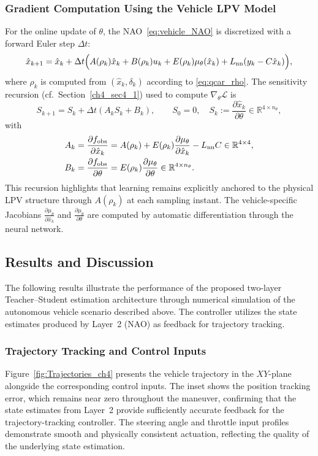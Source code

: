 \subsubsection{Gradient Computation Using the Vehicle LPV Model}\label{sec6_gradient}
For the online update of $\theta$, the NAO~\eqref{eq:vehicle_NAO} is discretized with a forward Euler step $\Delta t$:
\begin{equation}\label{eq:vehicle_NAO_discrete}
\hat{x}_{k+1} = \hat{x}_k + \Delta t\Big(A(\rho_k)\hat{x}_k + B(\rho_k)u_k + E(\rho_k)\mu_\theta(\hat{x}_k) + L_{\text{nn}}(y_k - C\hat{x}_k)\Big),
\end{equation}
where $\rho_k$ is computed from $(\hat{x}_k,\delta_k)$ according to \eqref{eq:qcar_rho}.
The sensitivity recursion (cf.~Section~\ref{ch4_sec4_1}) used to compute $\nabla_\theta\mathcal{L}$ is
\begin{equation}\label{eq:vehicle_sensitivity}
S_{k+1}=S_k+\Delta t\left(A_kS_k+B_k\right), \qquad S_0 = 0, \quad S_k:=\frac{\partial \hat{x}_k}{\partial \theta} \in \mathbb{R}^{4\times n_\theta},
\end{equation}
with
\begin{align}
    A_k &= \frac{\partial f_{\mathrm{obs}}}{\partial \hat{x}_k} = A(\rho_k) + E(\rho_k)\frac{\partial\mu_\theta}{\partial\hat{x}_k} - L_{\text{nn}} C \in \mathbb{R}^{4\times 4}, \label{eq:vehicle_Ak}\\
    B_k &= \frac{\partial f_{\mathrm{obs}}}{\partial \theta} = E(\rho_k)\frac{\partial\mu_\theta}{\partial\theta} \in \mathbb{R}^{4\times n_\theta}. \label{eq:vehicle_Bk}
\end{align}
This recursion highlights that learning remains explicitly anchored to the physical LPV structure through $A(\rho_k)$ at each sampling instant. The vehicle-specific Jacobians $\frac{\partial \mu_\theta}{\partial \hat{x}_k}$ and $\frac{\partial \mu_\theta}{\partial \theta}$ are computed by automatic differentiation through the neural network.

\subsection{Results and Discussion}
The following results illustrate the performance of the proposed two-layer Teacher--Student estimation architecture through numerical simulation of the autonomous vehicle scenario described above. The controller utilizes the state estimates produced by Layer~2 (NAO) as feedback for trajectory tracking.

\subsubsection{Trajectory Tracking and Control Inputs}
Figure~\ref{fig:Trajectories_ch4} presents the vehicle trajectory in the $XY$-plane alongside the corresponding control inputs. The inset shows the position tracking error, which remains near zero throughout the maneuver, confirming that the state estimates from Layer~2 provide sufficiently accurate feedback for the trajectory-tracking controller. The steering angle and throttle input profiles demonstrate smooth and physically consistent actuation, reflecting the quality of the underlying state estimation.

